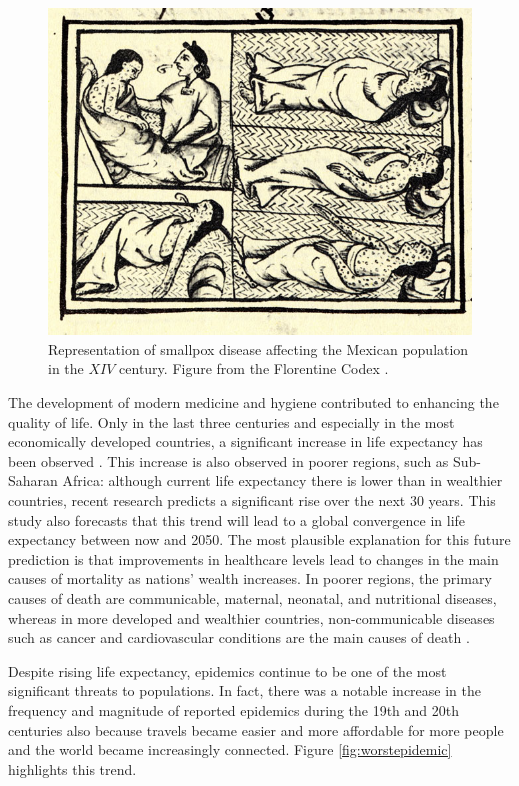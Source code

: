 \begin{figure}[ht]
	\centering
	\includegraphics[width=0.45\linewidth]{0_introduction/images_introduction/FlorentineCodex_smallpox}
	\caption[Smallpox on native Americans]{Representation of smallpox disease affecting the Mexican population in the $XIV$ century. Figure from the Florentine Codex \cite{Sahagun1965}. }
	\label{fig:florentinecodexsmallpox}
\end{figure}

The development of modern medicine and hygiene contributed to enhancing the quality of life. Only in the last three centuries and especially in the most economically developed countries, a significant increase in life expectancy has been observed \cite{Anderson_82}.
This increase is also observed in poorer regions, such as Sub-Saharan Africa: although current life expectancy there is lower than in wealthier countries, recent research \cite{Vollset_2024} predicts a significant rise over the next 30 years. This study also forecasts that this trend will lead to a global convergence in life expectancy between now and 2050.
The most plausible explanation for this future prediction is that improvements in healthcare levels lead to changes in the main causes of mortality as nations' wealth increases. In poorer regions, the primary causes of death are communicable, maternal, neonatal, and nutritional diseases, whereas in more developed and wealthier countries, non-communicable diseases such as cancer and cardiovascular conditions are the main causes of death \cite{eurostat}.

Despite rising life expectancy, epidemics continue to be one of the most significant threats to populations. In fact, there was a notable increase in the frequency and magnitude of reported epidemics during the 19th and 20th centuries \cite{Anderson_82} also because travels became easier and more affordable for more people and the world became increasingly connected. Figure \ref{fig:worstepidemic} highlights this trend.

